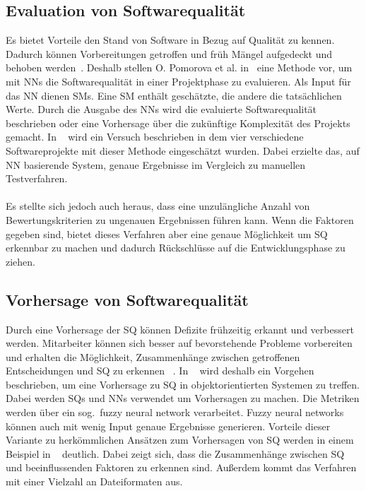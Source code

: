 \subsection{Evaluation von Softwarequalität}
Es bietet Vorteile den Stand von Software in Bezug auf Qualität zu kennen. Dadurch können Vorbereitungen getroffen und früh Mängel aufgedeckt und behoben werden~\cite{Pomorova2013}. Deshalb stellen O. Pomorova et al. in~\cite{Pomorova2013} eine Methode vor, um mit NNs die Softwarequalität in einer Projektphase zu evaluieren. Als Input für das NN dienen SMs. Eine SM enthält geschätzte, die andere die tatsächlichen Werte.
Durch die Ausgabe des NNs wird die evaluierte Softwarequalität beschrieben oder eine Vorhersage über die zukünftige Komplexität des Projekts gemacht. 
In ~\cite{Pomorova2013} wird ein Versuch beschrieben in dem vier verschiedene Softwareprojekte mit dieser Methode eingeschätzt wurden. Dabei erzielte das, auf NN basierende System, genaue Ergebnisse im Vergleich zu manuellen Testverfahren.\\
\\
Es stellte sich jedoch auch heraus, dass eine unzulängliche Anzahl von Bewertungskriterien zu ungenauen Ergebnissen führen kann.
Wenn die Faktoren gegeben sind, bietet dieses Verfahren aber eine genaue Möglichkeit um SQ erkennbar zu machen und dadurch Rückschlüsse auf die Entwicklungsphase zu ziehen.

\subsection{Vorhersage von Softwarequalität}
Durch eine Vorhersage der SQ können Defizite frühzeitig erkannt und verbessert werden. Mitarbeiter können sich besser auf bevorstehende Probleme vorbereiten und erhalten die Möglichkeit, Zusammenhänge zwischen getroffenen Entscheidungen und SQ zu erkennen ~\cite{Peng2009}. In ~\cite{Peng2009} wird deshalb ein Vorgehen beschrieben, um eine Vorhersage zu SQ in objektorientierten Systemen zu treffen. Dabei werden SQs und NNs verwendet um Vorhersagen zu machen. Die Metriken werden über ein sog.~fuzzy neural network verarbeitet. Fuzzy neural networks können auch mit wenig Input genaue Ergebnisse generieren.
Vorteile dieser Variante zu herkömmlichen Ansätzen zum Vorhersagen von SQ werden in einem Beispiel in ~\cite{Peng2009} deutlich. Dabei zeigt sich, dass die Zusammenhänge zwischen SQ und beeinflussenden Faktoren zu erkennen sind. Außerdem kommt das Verfahren mit einer Vielzahl an Dateiformaten aus.
